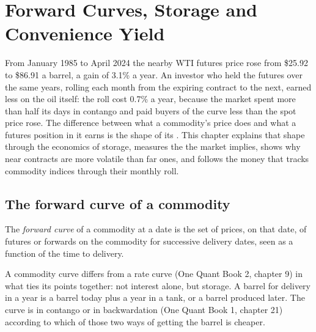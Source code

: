 \chapter{Forward Curves, Storage and Convenience Yield}\label{ch:m3:forward-curves-storage-and-convenience-yield}

From January 1985 to April 2024 the nearby WTI futures price rose from \$25.92 to \$86.91 a
barrel, a gain of 3.1\% a year. An investor who held the futures over the same years, rolling
each month from the expiring contract to the next, earned less on the oil itself: the roll
cost 0.7\% a year, because the market spent more than half its days in contango and paid
buyers of the curve less than the spot price rose. The difference between what a commodity's
price does and what a futures position in it earns is the shape of its . This
chapter explains that shape through the economics of storage, measures the 
the market implies, shows why near contracts are more volatile than far ones, and follows
the money that tracks commodity indices through their monthly roll.

\section{The forward curve of a commodity}

\begin{definition}\label{def:m3:forward-curves-storage-and-convenience-yield:curve}
The \emph{forward curve} of a commodity at a date is the set of prices, on
that date, of futures or forwards on the commodity for successive delivery dates, seen as a function
of the time to delivery.
\end{definition}

A commodity curve differs from a rate curve (One Quant Book 2, chapter 9) in what ties its points
together: not interest alone, but storage. A barrel for delivery in a year is a barrel today plus a
year in a tank, or a barrel produced later. The curve is in contango or in backwardation (One Quant
Book 1, chapter 21) according to which of those two ways of getting the barrel is cheaper.

